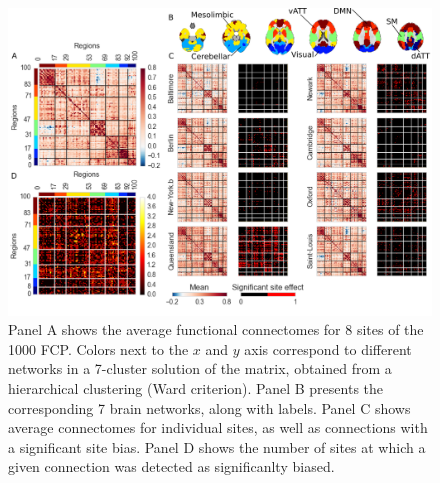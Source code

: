 \documentclass[authoryear]{elsarticle}
\begin{document}
\begin{figure}[htbp]
\begin{center}
\includegraphics[width=\linewidth]{../figures/connectome_multisite.png}
\end{center}
\caption[Connectome variability across sites]{
Panel A shows the average functional connectomes for 8 sites of the 1000 FCP. Colors next to the $x$ and $y$ axis correspond to different networks in a 7-cluster solution of the matrix, obtained from a hierarchical clustering (Ward criterion). Panel B presents the corresponding 7 brain networks, along with labels. Panel C shows average connectomes for individual sites, as well as connections with a significant site bias. Panel D shows the number of sites at which a given connection was detected as significanlty biased. 
}
\label{fig_connectome_variability}
\end{figure}
\end{document}
